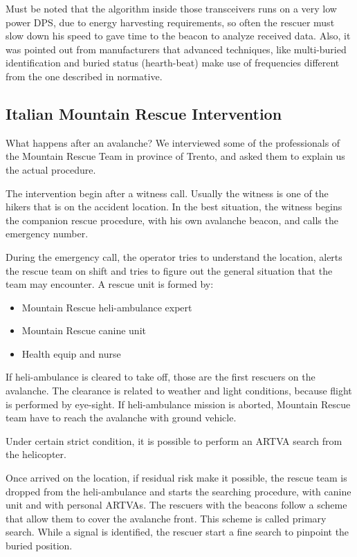 Must be noted that the algorithm inside those transceivers runs on a very low power DPS, due to energy harvesting requirements, so often the rescuer must slow down his speed to gave time to the beacon to analyze received data. Also, it was pointed out from manufacturers that advanced techniques, like multi-buried identification and buried status (hearth-beat) make use of frequencies different from the one described in normative.

\subsection{Italian Mountain Rescue Intervention}
What happens after an avalanche? We interviewed some of the professionals of the Mountain Rescue Team in province of Trento, and asked them to explain us the actual procedure.

The intervention begin after a witness call. Usually the witness is one of the hikers that is on the accident location. In the best situation, the witness begins the companion rescue procedure, with his own avalanche beacon, and calls the emergency number.

During the emergency call, the operator tries to understand the location, alerts the rescue team on shift and tries to figure out the general situation that the team may encounter. A rescue unit is formed by:
\begin{itemize}
\item Mountain Rescue heli-ambulance expert
\item Mountain Rescue canine unit
\item Health equip and nurse
\end{itemize}
If heli-ambulance is cleared to take off, those are the first rescuers on the avalanche. The clearance is related to weather and light conditions, because flight is performed by eye-sight. If heli-ambulance mission is aborted, Mountain Rescue team have to reach the avalanche with ground vehicle.

Under certain strict condition, it is possible to perform an ARTVA search from the helicopter.

Once arrived on the location, if residual risk make it possible, the rescue team is dropped from the heli-ambulance and starts the searching procedure, with canine unit and with personal ARTVAs. The rescuers with the beacons follow a scheme that allow them to cover the avalanche front. This scheme is called primary search. While a signal is identified, the rescuer start a fine search to pinpoint the buried position.

